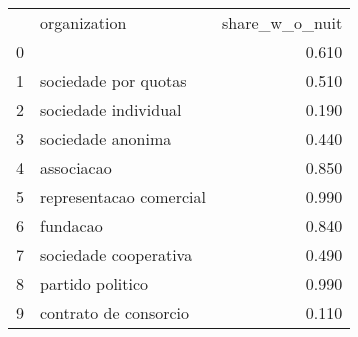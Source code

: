 \begin{tabular}{llr}
 & organization & share_w_o_nuit \\
0 &  & 0.610 \\
1 & sociedade por quotas & 0.510 \\
2 & sociedade individual & 0.190 \\
3 & sociedade anonima & 0.440 \\
4 & associacao & 0.850 \\
5 & representacao comercial & 0.990 \\
6 & fundacao & 0.840 \\
7 & sociedade cooperativa & 0.490 \\
8 & partido politico & 0.990 \\
9 & contrato de consorcio & 0.110 \\
\end{tabular}
